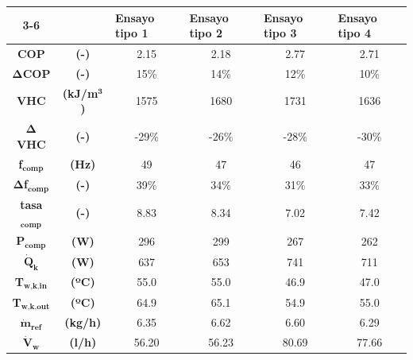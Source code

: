 
\begin{tabular}{cc|c|c|c|c|}
\cline{3-6}
\multicolumn{1}{l}{} & \multicolumn{1}{l|}{} & \multicolumn{1}{l|}{\textbf{Ensayo tipo 1}} & \multicolumn{1}{l|}{\textbf{Ensayo tipo 2}} & \multicolumn{1}{l|}{\textbf{Ensayo tipo 3}} & \multicolumn{1}{l|}{\textbf{Ensayo tipo 4}} \\ \hline
\multicolumn{1}{|c}{\textbf{COP}} & \textbf{(-)} & 2.15 & 2.18 & 2.77 & 2.71 \\ \hline
\multicolumn{1}{|c}{$\bm{\Delta}$\textbf{COP}} & \textbf{(-)} & 15\% & 14\% & 12\% & 10\% \\ \hline
\multicolumn{1}{|c}{\textbf{VHC}} & \textbf{(kJ/m$^\textbf{3}$)} & 1575 & 1680 & 1731 & 1636 \\ \hline
\multicolumn{1}{|c}{$\bm{\Delta}$\textbf{VHC}} & \textbf{(-)} & -29\% & -26\% & -28\% & -30\% \\ \hline
\multicolumn{1}{|c}{\textbf{f}$_\textbf{comp}$} & \textbf{(Hz)} & 49 & 47 & 46 & 47 \\ \hline
\multicolumn{1}{|c}{$\bm{\Delta}$\textbf{f}$_\textbf{comp}$} & \textbf{(-)} & 39\% & 34\% & 31\% & 33\% \\ \hline
\multicolumn{1}{|c}{\textbf{tasa}$_\textbf{comp}$} & \textbf{(-)} & 8.83 & 8.34 & 7.02 & 7.42 \\ \hline
\multicolumn{1}{|c}{\textbf{P}$_\textbf{comp}$} & \textbf{(W)} & 296 & 299 & 267 & 262 \\ \hline
\multicolumn{1}{|c}{$\dot{\textbf{Q}}_\textbf{k}$} & \textbf{(W)} & 637 & 653 & 741 & 711 \\ \hline
\multicolumn{1}{|c}{\textbf{T}$_\textbf{w,k,in}$} & \textbf{(ºC)} & 55.0 & 55.0 & 46.9 & 47.0 \\ \hline
\multicolumn{1}{|c}{\textbf{T}$_\textbf{w,k,out}$} & \textbf{(ºC)} & 64.9 & 65.1 & 54.9 & 55.0 \\ \hline
\multicolumn{1}{|c}{$\dot{\textbf{m}}_\textbf{ref}$} & \textbf{(kg/h)} & 6.35 & 6.62 & 6.60 & 6.29 \\ \hline
\multicolumn{1}{|c}{$\dot{\textbf{V}}_\textbf{w}$} & \textbf{(l/h)} & 56.20 & 56.23 & 80.69 & 77.66 \\ \hline
\end{tabular}
